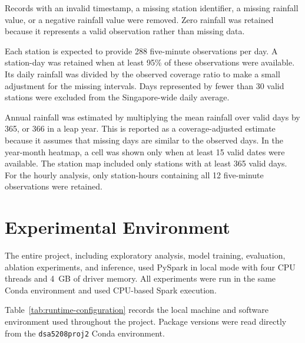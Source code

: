 \documentclass[11pt]{article}
\begin{document}
Records with an invalid timestamp, a missing station identifier, a missing
rainfall value, or a negative rainfall value were removed. Zero rainfall was
retained because it represents a valid observation rather than missing data.

Each station is expected to provide 288 five-minute observations per day. A
station-day was retained when at least 95\% of these observations were
available. Its daily rainfall was divided by the observed coverage ratio to
make a small adjustment for the missing intervals. Days represented by fewer
than 30 valid stations were excluded from the Singapore-wide daily average.

Annual rainfall was estimated by multiplying the mean rainfall over valid
days by 365, or 366 in a leap year. This is reported as a coverage-adjusted
estimate because it assumes that missing days are similar to the observed
days. In the year-month heatmap, a cell was shown only when at least 15 valid
dates were available. The station map included only stations with at least
365 valid days. For the hourly analysis, only station-hours containing all 12
five-minute observations were retained.

\section{Experimental Environment}

The entire project, including exploratory analysis, model training,
evaluation, ablation experiments, and inference, used PySpark in local mode
with four CPU threads and 4~GB of driver memory. All experiments were run in
the same Conda environment and used CPU-based Spark execution.

Table~\ref{tab:runtime-configuration} records the local machine and software
environment used throughout the project. Package versions were read directly
from the \texttt{dsa5208proj2} Conda environment.
\end{document}

